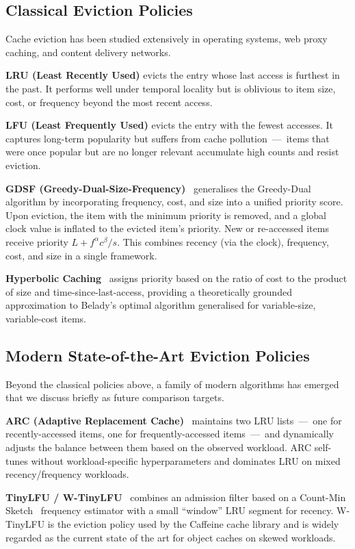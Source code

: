 \documentclass[sigconf, nonacm, review=false, screen=true]{acmart}
\begin{document}
\subsection{Classical Eviction Policies}
Cache eviction has been studied extensively in operating systems, web
proxy caching, and content delivery networks.

\textbf{LRU (Least Recently Used)} evicts the entry whose last access is
furthest in the past. It performs well under temporal locality but is
oblivious to item size, cost, or frequency beyond the most recent access.

\textbf{LFU (Least Frequently Used)} evicts the entry with the fewest
accesses. It captures long-term popularity but suffers from cache
pollution~---~items that were once popular but are no longer relevant
accumulate high counts and resist eviction.

\textbf{GDSF (Greedy-Dual-Size-Frequency)}~\cite{cherkasova1998gdsf,
arlitt2000eval} generalises the Greedy-Dual algorithm by incorporating
frequency, cost, and size into a unified priority score. Upon eviction,
the item with the minimum priority is removed, and a global clock value
is inflated to the evicted item's priority. New or re-accessed items
receive priority $L + f^\alpha c^\beta / s$. This combines recency
(via the clock), frequency, cost, and size in a single framework.

\textbf{Hyperbolic Caching}~\cite{hyperbolic} assigns priority based on
the ratio of cost to the product of size and time-since-last-access,
providing a theoretically grounded approximation to Belady's optimal
algorithm generalised for variable-size, variable-cost items.

\subsection{Modern State-of-the-Art Eviction Policies}
Beyond the classical policies above, a family of modern algorithms has
emerged that we discuss briefly as future comparison targets.

\textbf{ARC (Adaptive Replacement Cache)}~\cite{megiddo2003arc} maintains
two LRU lists~---~one for recently-accessed items, one for
frequently-accessed items~---~and dynamically adjusts the balance between
them based on the observed workload. ARC self-tunes without workload-specific
hyperparameters and dominates LRU on mixed recency/frequency workloads.

\textbf{TinyLFU / W-TinyLFU}~\cite{tinylfu} combines an admission filter
based on a Count-Min Sketch~\cite{countminsketch} frequency estimator with
a small ``window'' LRU segment for recency. W-TinyLFU is the eviction
policy used by the Caffeine cache library and is widely regarded as the
current state of the art for object caches on skewed workloads.
\end{document}
